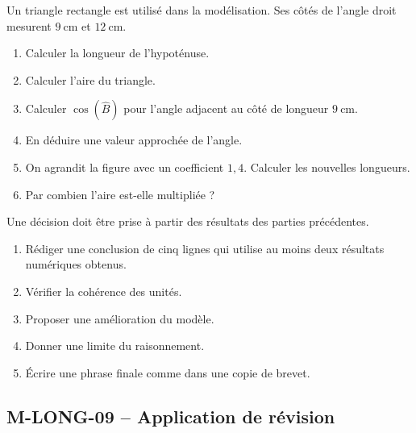 \documentclass[11pt,a4paper]{article}
\newcounter{exercice}
\begin{document}
\begin{exercice}
Un triangle rectangle est utilisé dans la modélisation. Ses côtés de l'angle droit mesurent $9\ \mathrm{cm}$ et $12\ \mathrm{cm}$.
\begin{enumerate}
  \item Calculer la longueur de l'hypoténuse.
  \item Calculer l'aire du triangle.
  \item Calculer $\cos(\widehat{B})$ pour l'angle adjacent au côté de longueur $9\ \mathrm{cm}$.
  \item En déduire une valeur approchée de l'angle.
  \item On agrandit la figure avec un coefficient $1{,}4$. Calculer les nouvelles longueurs.
  \item Par combien l'aire est-elle multipliée ?
\end{enumerate}
\end{exercice}

\begin{exercice}
Une décision doit être prise à partir des résultats des parties précédentes.
\begin{enumerate}
  \item Rédiger une conclusion de cinq lignes qui utilise au moins deux résultats numériques obtenus.
  \item Vérifier la cohérence des unités.
  \item Proposer une amélioration du modèle.
  \item Donner une limite du raisonnement.
  \item Écrire une phrase finale comme dans une copie de brevet.
\end{enumerate}
\end{exercice}
\newpage
\subsection{M-LONG-09 -- Application de révision}
\end{document}
